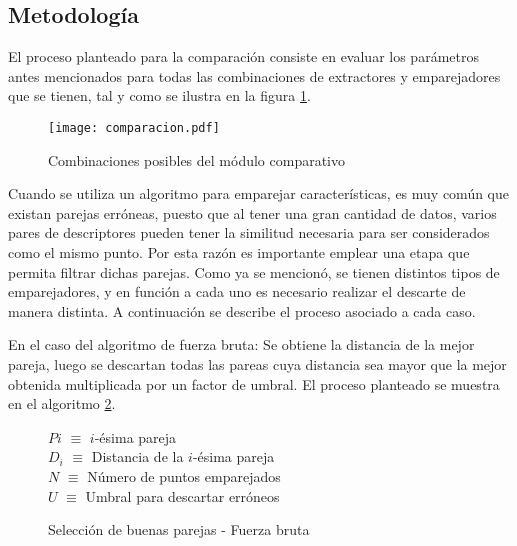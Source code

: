 \subsection{Metodología}

El proceso planteado para la comparación consiste en evaluar los parámetros antes mencionados para todas las combinaciones de extractores y emparejadores que se tienen, tal y como se ilustra en la figura \ref{imagen:comparacion}.

\begin{figure}[H]
	\centering
	\texttt{[image: comparacion.pdf]}
	\caption[Combinación de algoritmos para el analisis de rendimiento]{Combinaciones posibles del módulo comparativo}
	\label{imagen:comparacion}
\end{figure}

Cuando se utiliza un algoritmo para emparejar características, es muy común que existan parejas erróneas, puesto que al tener una gran cantidad de datos, varios pares de descriptores pueden tener la similitud necesaria para ser considerados como el mismo punto. Por esta razón es importante emplear una etapa que permita filtrar dichas parejas. Como ya se mencionó, se tienen distintos tipos de emparejadores, y en función a cada uno es necesario realizar el descarte de manera distinta. A continuación se describe el proceso asociado a cada caso.

En el caso del algoritmo de fuerza bruta: Se obtiene la distancia de la mejor pareja, luego se descartan todas las pareas cuya distancia sea mayor que la mejor obtenida multiplicada por un factor de umbral. El proceso planteado se muestra en el algoritmo \ref{fuerzabruta}.

\begin{figure}[h]
	\centering
	\begin{minipage}{.7\linewidth}
		\begin{algorithm}[H] %
			\caption{Selección de buenas parejas - Fuerza bruta}
			\label{fuerzabruta}
			\SetAlgoLined
			$P{i}$ $\equiv$  $i$-ésima pareja\\
			$D_{i}$ $\equiv$ Distancia de la $i$-ésima pareja\\
			$N$ $\equiv$ Número de puntos emparejados\\
			$U$ $\equiv$ Umbral para descartar erróneos\\
		\end{algorithm}
	\end{minipage}
\end{figure}

